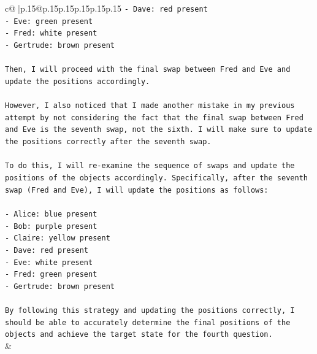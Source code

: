\documentclass{article}
\begin{document}
{\begin{supertabular}{c@{$\;$}|p{.15\linewidth}@{}p{.15\linewidth}p{.15\linewidth}p{.15\linewidth}p{.15\linewidth}p{.15\linewidth}}
{{{\texttt{{-} Dave: red present} \\
\texttt{{-} Eve: green present} \\
\texttt{{-} Fred: white present} \\
\texttt{{-} Gertrude: brown present} \\
\\ 
\texttt{Then, I will proceed with the final swap between Fred and Eve and update the positions accordingly.} \\
\\ 
\texttt{However, I also noticed that I made another mistake in my previous attempt by not considering the fact that the final swap between Fred and Eve is the seventh swap, not the sixth. I will make sure to update the positions correctly after the seventh swap.} \\
\\ 
\texttt{To do this, I will re{-}examine the sequence of swaps and update the positions of the objects accordingly. Specifically, after the seventh swap (Fred and Eve), I will update the positions as follows:} \\
\\ 
\texttt{{-} Alice: blue present} \\
\texttt{{-} Bob: purple present} \\
\texttt{{-} Claire: yellow present} \\
\texttt{{-} Dave: red present} \\
\texttt{{-} Eve: white present} \\
\texttt{{-} Fred: green present} \\
\texttt{{-} Gertrude: brown present} \\
\\ 
\texttt{By following this strategy and updating the positions correctly, I should be able to accurately determine the final positions of the objects and achieve the target state for the fourth question.} \\
            }
        }
    }
    & \\ \\

\end{supertabular}
}
\end{document}
